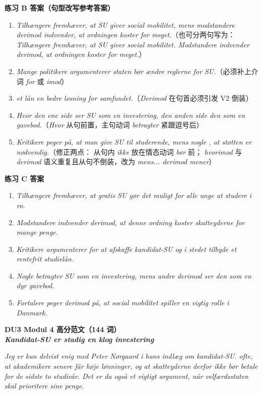 \begin{answerbox}
\textbf{练习 B 答案（句型改写参考答案）}
\begin{enumerate}
  \item \textit{Tilhængere fremhæver, at SU giver social mobilitet, mens modstandere derimod indvender, at ordningen koster for meget.}（也可分两句写为：\textit{Tilhængere fremhæver, at SU giver social mobilitet. Modstandere indvender derimod, at ordningen koster for meget.}）
  \item \textit{Mange politikere argumenterer  staten bør ændre reglerne for SU.}（必须补上介词 \textit{for} 或 \textit{imod}）
  \item \textit{ et lån en bedre løsning for samfundet.}（\textit{Derimod} 在句首必须引发 V2 倒装）
  \item \textit{Hvor den ene side ser SU som en investering,  den anden side den som en gavebod.}（\textit{Hvor} 从句前置，主句动词 \textit{betragter} 紧跟逗号后）
  \item \textit{Kritikere peger på, at man  give SU til studerende, mens nogle , at støtten er nødvendig.}（修正两点： 从句内 \textit{ikke} 放在情态动词 \textit{bør} 前； \textit{hvorimod} 与 \textit{derimod} 语义重复且从句不倒装，改为 \textit{mens... derimod mener}）
\end{enumerate}

\textbf{练习 C 答案}
\begin{enumerate}
  \item \textit{Tilhængere fremhæver, at gratis SU gør det muligt for alle unge at studere i ro.}
  \item \textit{Modstandere indvender derimod, at denne ordning koster skatteyderne for mange penge.}
  \item \textit{Kritikere argumenterer for at afskaffe kandidat-SU og i stedet tilbyde et rentefrit studielån.}
  \item \textit{Nogle betragter SU som en investering, mens andre derimod ser den som en dyr gavebod.}
  \item \textit{Fortalere peger derimod på, at social mobilitet spiller en vigtig rolle i Danmark.}
\end{enumerate}

\textbf{DU3 Modul 4 高分范文（144 词）}\\
\textit{\textbf{Kandidat-SU er stadig en klog investering}}

\textit{Jeg er kun delvist enig med Peter Nørgaard i hans indlæg om kandidat-SU.  ofte, at akademikere senere får høje lønninger, og at skatteyderne derfor ikke bør betale for de sidste to studieår. Det er da også et vigtigt argument, når velfærdsstaten skal prioritere sine penge.}


\end{answerbox}
